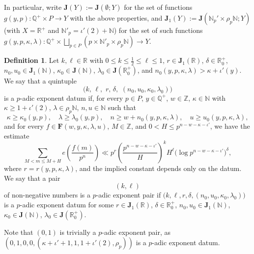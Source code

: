 \documentclass[11pt,reqno]{amsart}
\numberwithin{equation}{section}
\theoremstyle{plain}
\theoremstyle{definition}
\newtheorem{definition}[lemma]{Definition}
\begin{document}
In particular, write $\mathbf{J}(Y) := \mathbf{J}(\emptyset;Y)$ for the set of functions 
$g(y,p) : \mathbb{Q}^{+} \times P \to Y$ with the above properties, and 
$\mathbf{J}_1(Y) := \mathbf{J}(\mathbb{N}_p' \times \rho_p \mathbb{N};Y)$ 
(with $X = \mathbb{R}^{+}$ and $\mathbb{N}'_p = \iota'(2) + \mathbb{N}$) for the set of such functions $g(y,p,\kappa,\lambda) : \mathbb{Q}^{+} \times \bigsqcup_{p \in P} ({p} \times \mathbb{N}'_p \times \rho_p \mathbb{N}) \to Y$.

\begin{definition}\label{exponent pair}
Let $k,\ell\in\mathbb{R}$ with $0\leqslant k\leqslant\frac12\leqslant\ell\leqslant 1$, $r\in\mathbf{J}_1(\mathbb{R})$, $\delta\in\mathbb{R}^{+}_0$, $n_0,u_0\in\mathbf{J}_1(\mathbb{N})$, $\kappa_0\in\mathbf{J}(\mathbb{N})$, $\lambda_0\in\mathbf{J}(\mathbb{R}^{+}_0)$, and $n_0(y,p,\kappa,\lambda)>\kappa+\iota'(y)$.
We say that a quintuple $$\big(k,\,\ell,\,\,r,\,\delta,\,\,(n_0,u_0,\kappa_0,\lambda_0)\big)$$ is a $p$-adic exponent datum if, for every $p\in P$, $y\in\mathbb{Q}^{+}$, $w\in\mathbb{Z}$, $\kappa\in\mathbb{N}$ with $\kappa\geqslant 1+\iota'(2)$, $\lambda\in\rho_p\mathbb{N}$, $n,u\in\mathbb{N}$ such that
$$ \kappa\geqslant\kappa_0(y,p),\quad\lambda\geqslant\lambda_0(y,p),\quad n\geqslant w+n_0(y,p,\kappa,\lambda),\quad u\geqslant u_0(y,p,\kappa,\lambda), $$
and for every $f\in\mathbf{F}(w,y,\kappa,\lambda,u)$, $M\in\mathbb{Z}$, and $0<H\leqslant p^{n-w-\kappa-\iota'}$, we have the estimate
\begin{equation}
\label{SharpDef}
\sum_{M < m\leqslant M+H}e\left(\frac{f(m)}{p^n}\right)\ll p^{r}\left(\frac{p^{n-w-\kappa-\iota'}}H\right)^kH^{\ell}
\big(\log p^{n-w-\kappa-\iota'}\big)^{\delta},
\end{equation}
where $r=r(y,p,\kappa,\lambda)$, and the implied constant depends only on the datum.
We say that a pair
$$ (k,\ell) $$
of non-negative numbers is a $p$-adic exponent pair if $\big(k,\ell,r,\delta,(n_0,u_0,\kappa_0,\lambda_0)\big)$ is a $p$-adic exponent datum for some $r\in\mathbf{J}_1(\mathbb{R})$, $\delta\in\mathbb{R}^{+}_0$, $n_0,u_0\in\mathbf{J}_1(\mathbb{N})$, $\kappa_0\in\mathbf{J}(\mathbb{N})$, $\lambda_0\in\mathbf{J}(\mathbb{R}^{+}_0)$.
\end{definition}
Note that $(0,1)$ is trivially a $p$-adic exponent pair, as $(0,1,0,0,(\kappa+\iota'+1,1,1+\iota'(2),\rho_p))$ is a $p$-adic exponent datum. 
\end{document}
